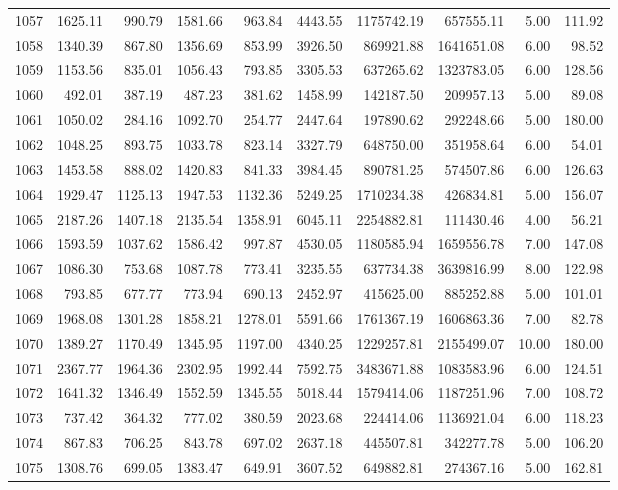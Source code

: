 \begin{tabular}{lrrrrrrrrr}
1057 & 1625.11 & 990.79 & 1581.66 & 963.84 & 4443.55 & 1175742.19 & 657555.11 & 5.00 & 111.92 \\
1058 & 1340.39 & 867.80 & 1356.69 & 853.99 & 3926.50 & 869921.88 & 1641651.08 & 6.00 & 98.52 \\
1059 & 1153.56 & 835.01 & 1056.43 & 793.85 & 3305.53 & 637265.62 & 1323783.05 & 6.00 & 128.56 \\
1060 & 492.01 & 387.19 & 487.23 & 381.62 & 1458.99 & 142187.50 & 209957.13 & 5.00 & 89.08 \\
1061 & 1050.02 & 284.16 & 1092.70 & 254.77 & 2447.64 & 197890.62 & 292248.66 & 5.00 & 180.00 \\
1062 & 1048.25 & 893.75 & 1033.78 & 823.14 & 3327.79 & 648750.00 & 351958.64 & 6.00 & 54.01 \\
1063 & 1453.58 & 888.02 & 1420.83 & 841.33 & 3984.45 & 890781.25 & 574507.86 & 6.00 & 126.63 \\
1064 & 1929.47 & 1125.13 & 1947.53 & 1132.36 & 5249.25 & 1710234.38 & 426834.81 & 5.00 & 156.07 \\
1065 & 2187.26 & 1407.18 & 2135.54 & 1358.91 & 6045.11 & 2254882.81 & 111430.46 & 4.00 & 56.21 \\
1066 & 1593.59 & 1037.62 & 1586.42 & 997.87 & 4530.05 & 1180585.94 & 1659556.78 & 7.00 & 147.08 \\
1067 & 1086.30 & 753.68 & 1087.78 & 773.41 & 3235.55 & 637734.38 & 3639816.99 & 8.00 & 122.98 \\
1068 & 793.85 & 677.77 & 773.94 & 690.13 & 2452.97 & 415625.00 & 885252.88 & 5.00 & 101.01 \\
1069 & 1968.08 & 1301.28 & 1858.21 & 1278.01 & 5591.66 & 1761367.19 & 1606863.36 & 7.00 & 82.78 \\
1070 & 1389.27 & 1170.49 & 1345.95 & 1197.00 & 4340.25 & 1229257.81 & 2155499.07 & 10.00 & 180.00 \\
1071 & 2367.77 & 1964.36 & 2302.95 & 1992.44 & 7592.75 & 3483671.88 & 1083583.96 & 6.00 & 124.51 \\
1072 & 1641.32 & 1346.49 & 1552.59 & 1345.55 & 5018.44 & 1579414.06 & 1187251.96 & 7.00 & 108.72 \\
1073 & 737.42 & 364.32 & 777.02 & 380.59 & 2023.68 & 224414.06 & 1136921.04 & 6.00 & 118.23 \\
1074 & 867.83 & 706.25 & 843.78 & 697.02 & 2637.18 & 445507.81 & 342277.78 & 5.00 & 106.20 \\
1075 & 1308.76 & 699.05 & 1383.47 & 649.91 & 3607.52 & 649882.81 & 274367.16 & 5.00 & 162.81 \\

\end{tabular}
